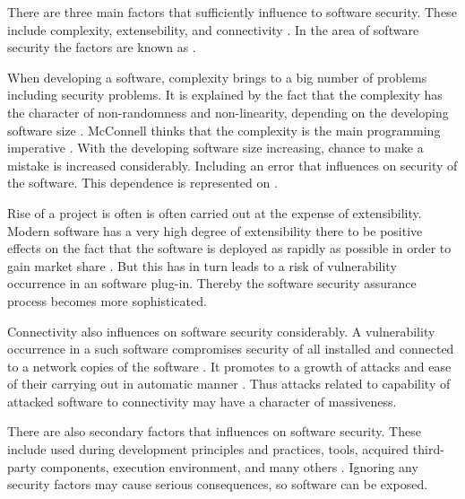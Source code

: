 %
There are three main factors that sufficiently influence to software security. 
%
These include complexity, extensebility, and connectivity . 
%
In the area of software security the factors are known as  . 

%
When developing a software, complexity brings to a big number of problems including security problems. 
%
It is explained by the fact that the complexity has the character of non-randomness and non-linearity, depending on the developing software size . 
%
McConnell thinks that the complexity is the main programming imperative . 
%
With the developing software size increasing, \A chance to make a mistake is increased considerably. 
%
Including an error that influences on security of the software. 
%
This dependence is represented on . 


%
Rise of a project is often is often carried out at the expense of extensibility. 
%
Modern software has a very high degree of extensibility there to be positive effects on the fact that the software is deployed as rapidly as possible in order to gain market share . 
%
But this has in turn leads to a risk of vulnerability occurrence in an software plug-in. 
%
Thereby the software security assurance process becomes more sophisticated. 

%
Connectivity also influences on software security considerably. 
%
A vulnerability occurrence in a such software compromises security of all installed and connected to a network copies of the software  . 
%
It promotes to a growth of attacks and ease of their carrying out in automatic manner . 
%
Thus attacks related to capability of attacked software to connectivity may have a character of massiveness. 

%
There are also secondary factors that influences on software security. 
%
These include used during development principles and practices, tools, acquired third-party components, execution environment, and many others . 
%
Ignoring any security factors may cause serious consequences, so software can be exposed. 